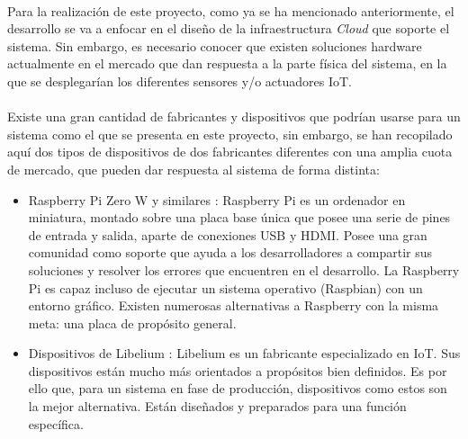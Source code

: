 \documentclass[../../memoria.tex]{subfiles}
\begin{document}
\paragraph{}
Para la realización de este proyecto, como ya se ha mencionado anteriormente, el desarrollo se va a enfocar en el diseño de la infraestructura \textit{Cloud} que soporte el sistema. Sin embargo, es necesario conocer que existen soluciones hardware actualmente en el mercado que dan respuesta a la parte física del sistema, en la que se desplegarían los diferentes sensores y/o actuadores IoT.

\paragraph{}
Existe una gran cantidad de fabricantes y dispositivos que podrían usarse para un sistema como el que se presenta en este proyecto, sin embargo, se han recopilado aquí dos tipos de dispositivos de dos fabricantes diferentes con una amplia cuota de mercado, que pueden dar respuesta al sistema de forma distinta:

\begin{itemize}

    \item Raspberry Pi Zero W y similares \cite{raspberry}: Raspberry Pi es un ordenador en miniatura, montado sobre una placa base única que posee una serie de pines de entrada y salida, aparte de conexiones USB y HDMI. Posee una gran comunidad como soporte que ayuda a los desarrolladores a compartir sus soluciones y resolver los errores que encuentren en el desarrollo. La Raspberry Pi es capaz incluso de ejecutar un sistema operativo (Raspbian) con un entorno gráfico. Existen numerosas alternativas a Raspberry con la misma meta: una placa de propósito general.

    \item Dispositivos de Libelium \cite{libelium}: Libelium es un fabricante especializado en IoT. Sus dispositivos están mucho más orientados a propósitos bien definidos. Es por ello que, para un sistema en fase de producción, dispositivos como estos son la mejor alternativa. Están diseñados y preparados para una función específica.
\end{itemize}
\end{document}
